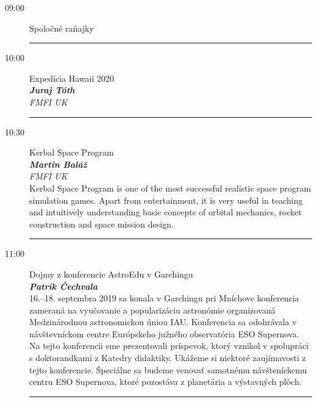 \documentclass[a4paper]{report}
\begin{document}
        \begin{description}
                            \item[09:00]
                    {\Large Spoločné raňajky} \\[1ex]
                                                                                \rule{\paperwidth}{0.4pt}
                            \item[10:00]
                    {\Large Expedícia Hawaii 2020} \\[1ex]
                                            \textit{\textbf{Juraj Tóth}} \\%
                                        \textit{FMFI UK} \\[1ex]                                        \rule{\paperwidth}{0.4pt}
                            \item[10:30]
                    {\Large Kerbal Space Program} \\[1ex]
                                            \textit{\textbf{Martin Baláž}} \\%
                                        \textit{FMFI UK} \\[1ex]                    Kerbal Space Program is one of the most successful realistic space program simulation games. Apart from entertainment, it is very useful in teaching and intuitively understanding basic concepts of orbital mechanics, rocket construction and space mission design.
 \\                    \rule{\paperwidth}{0.4pt}
                            \item[11:00]
                    {\Large Dojmy z konferencie AstroEdu v Garchingu} \\[1ex]
                                            \textit{\textbf{Patrik Čechvala}} \\%
                                                            16.--18. septembra 2019 sa konala v Garchingu pri Mníchove konferencia zameraná na vyučovanie a popularizáciu astronómie organizovaná Medzinárodnou astronomickou úniou IAU. Konferencia sa odohrávala v návštevníckom centre Európskeho južného observatória ESO Supernova. Na tejto konferencii sme prezentovali príspevok, ktorý vznikol v spolupráci s doktorandkami z Katedry didaktiky. Ukážeme si niektoré zaujímavosti z tejto konferencie. Špeciálne sa budeme venovať samotnému návšteníckemu centru ESO Supernova, ktoré pozostáva z planetária a výstavných plôch.
 \\                    \rule{\paperwidth}{0.4pt}

\end{description}
\end{document}
